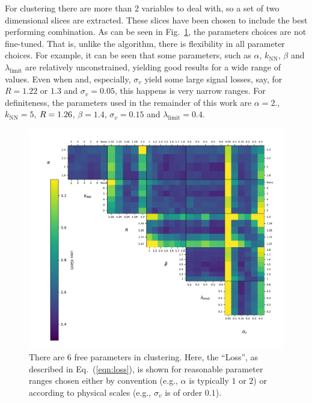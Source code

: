 For \spectral{} clustering there are more than 2 variables to deal with, 
so a set of two dimensional slices are extracted. 
These slices have been chosen to include the best performing combination.
%
    As can be seen in Fig.~\ref{fig:scan_spectral}, the parameters choices  are not fine-tuned. That is, 
    unlike the \antikt{} algorithm, there is flexibility in all parameter choices. For example, it can be seen that some parameters, such as \(\alpha\), \(k_\text{NN}\), \(\beta\)
    and \(\lambda_\text{limit}\) are relatively unconstrained,
    yielding  good results for a wide range of values.
    Even when \stoppingdeltar{} and, especially, \(\sigma_v\) yield some large signal losses,
    say, for \(R=1.22\) or \(1.3\) and \(\sigma_v=0.05\), this happens is very narrow ranges. 
    For definiteness, the
    parameters used in the remainder of this work are \(\alpha=2.\), \(k_\text{NN}=5\), \(R{} = 1.26\), \(\beta = 1.4\), \(\sigma_v = 0.15\) and \(\lambda_\text{limit} = 0.4\).
\clearpage
    \begin{figure}[!t]
            \includegraphics[width=1\textwidth]{graphics/trangle_scan_complete}
            \caption{There are 6 free parameters in \spectral{} clustering.
                Here, the ``Loss'', as described in Eq.~(\ref{eqn:loss}), is shown for reasonable  parameter ranges chosen
                either by convention (e.g., \(\alpha\) is typically \(1\) or \(2\))
                or according to physical scales (e.g., $\sigma_v$ is of order \(0.1\)).
             }\label{fig:scan_spectral}
    \end{figure}    


